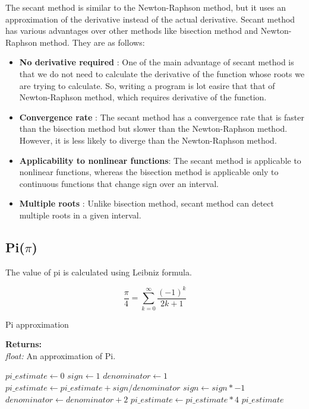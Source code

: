 \documentclass{report}
\begin{document}
    \begin{flushleft}
      The secant method is similar to the Newton-Raphson method, but it uses an approximation of the derivative instead of the actual derivative. Secant method has various advantages over other methods like bisection method and Newton-Raphson method. They are as follows:
      \begin{itemize}
        \item \textbf{No derivative required} : One of the main advantage of secant method is that we do not need to calculate the derivative of the function whose roots we are trying to calculate. So, writing a program is lot easire that that of Newton-Raphson method, which requires derivative of the function.
        \item \textbf{Convergence rate} : The secant method has a convergence rate that is faster than the bisection method but slower than the Newton-Raphson method. However, it is less likely to diverge than the Newton-Raphson method.
        \item \textbf{Applicability to nonlinear functions}: The secant method is applicable to nonlinear functions, whereas the bisection method is applicable only to continuous functions that change sign over an interval.
        \item \textbf{Multiple roots} : Unlike bisection method, secant method can detect multiple roots in a given interval.
      \end{itemize}
    \end{flushleft}

\subsection{Pi($\pi$)}
  \begin{flushleft}
    The value of pi is calculated using Leibniz formula.
  \end{flushleft}
  $${\frac {\pi }{4}}=\sum _{k=0}^{\infty }{\frac {(-1)^{k}}{2k+1}}$$

  \begin{algorithm}
    \caption{Pi approximation}\label{Pi Approximation}
      \begin{tabbing}
        \textbf{Returns:}\\
          \hspace{1em}\textit{float:} An approximation of Pi.
      \end{tabbing}
      \vspace{1 em}
    \begin{algorithmic}[1]
      \State $pi\_estimate \gets 0$
      \State $sign \gets 1$
      \State $denominator \gets 1$
        \State $pi\_estimate \gets pi\_estimate + sign / denominator$ 
        \State $sign \gets sign * -1$
        \State $denominator \gets denominator + 2$ 
      \EndFor
      \State $pi\_estimate \gets pi\_estimate * 4$ 
      \State \Return $pi\_estimate$
    \end{algorithmic}
  \end{algorithm}
\end{document}
